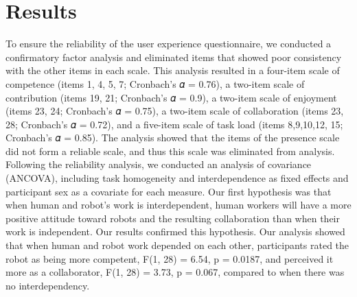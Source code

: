 \section{Results}
       To ensure the reliability of the user experience questionnaire, we conducted a confirmatory factor analysis and eliminated items that showed poor consistency with the other items in each scale. This analysis resulted in a four-item scale of competence (items 1, 4, 5, 7; Cronbach’s 𝛼 = 0.76), a two-item scale of contribution (items 19, 21; Cronbach’s 𝛼 = 0.9), a two-item scale of enjoyment (items 23, 24; Cronbach’s 𝛼 = 0.75),  a two-item scale of collaboration (items 23, 28; Cronbach’s 𝛼 = 0.72), and a five-item scale of task load (items 8,9,10,12, 15; Cronbach’s 𝛼 = 0.85). The analysis showed that the items of the presence scale did not form a reliable scale, and thus this scale was eliminated from analysis.
       Following the reliability analysis, we conducted an analysis of covariance (ANCOVA), including task homogeneity and interdependence as fixed effects and participant sex as a covariate for each measure. Our first hypothesis was that when human and robot’s work is interdependent, human workers will have a more positive attitude toward robots and the resulting collaboration than when their work is independent. Our results confirmed this hypothesis. Our  analysis showed that when human and robot work depended on each other, participants rated the robot as being more competent, F(1, 28) = 6.54, p = 0.0187, and perceived it more as a collaborator, F(1, 28) = 3.73, p = 0.067, compared to when there was no interdependency. 


